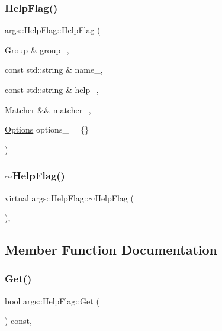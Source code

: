 \subsubsection{\texorpdfstring{Help\+Flag()}{HelpFlag()}}
{\footnotesize\ttfamily args\+::\+Help\+Flag\+::\+Help\+Flag (\begin{DoxyParamCaption}\item[{\hyperlink{classargs_1_1_group}{Group} \&}]{group\+\_\+,  }\item[{const std\+::string \&}]{name\+\_\+,  }\item[{const std\+::string \&}]{help\+\_\+,  }\item[{\hyperlink{classargs_1_1_matcher}{Matcher} \&\&}]{matcher\+\_\+,  }\item[{\hyperlink{namespaceargs_aa530c0f95194aa275f49a5f299ac9e77}{Options}}]{options\+\_\+ = {\ttfamily \{\}} }\end{DoxyParamCaption})\hspace{0.3cm}{\ttfamily [inline]}}

\mbox{\label{classargs_1_1_help_flag_acd28f5106f158d7da9aace1ea55bea63}} 
\subsubsection{\texorpdfstring{$\sim$\+Help\+Flag()}{~HelpFlag()}}
{\footnotesize\ttfamily virtual args\+::\+Help\+Flag\+::$\sim$\+Help\+Flag (\begin{DoxyParamCaption}{ }\end{DoxyParamCaption})\hspace{0.3cm}{\ttfamily [inline]}, {\ttfamily [virtual]}}



\subsection{Member Function Documentation}
\mbox{\label{classargs_1_1_help_flag_a4a7d60a403961377da9cf9203f7b4203}} 
\subsubsection{\texorpdfstring{Get()}{Get()}}
{\footnotesize\ttfamily bool args\+::\+Help\+Flag\+::\+Get (\begin{DoxyParamCaption}{ }\end{DoxyParamCaption}) const\hspace{0.3cm}{\ttfamily [inline]}, {\ttfamily [noexcept]}}

